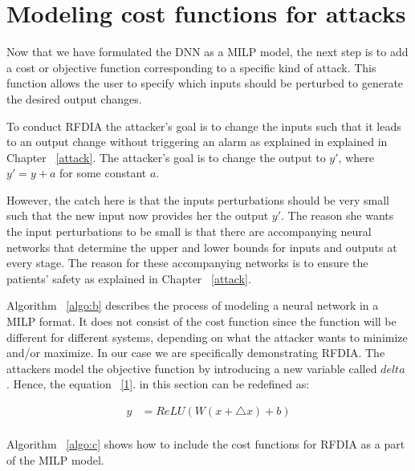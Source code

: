 \section{Modeling cost functions for attacks}
\label{section:costfunction}
Now that we have formulated the DNN as a MILP model, the next step is to add a cost or objective function corresponding to a specific kind of attack. 
This function allows the user to specify which inputs should be perturbed to generate the desired output changes.

To conduct \ac{RFDIA} the attacker's goal is to change the inputs such that it leads to an output change without triggering an alarm as explained in explained in Chapter ~\ref{attack}. 
The attacker's goal is to change the output to $y'$, where $y' = y + a$ for some constant $a$. 

 



However, the catch here is that the inputs perturbations should be very small such that the new input now provides her the output $y'$.  
The reason she wants the input perturbations to be small is that there are accompanying neural networks that determine the upper and lower bounds for inputs and outputs at every stage. 
The reason for these accompanying networks is to ensure the patients' safety as explained in Chapter ~\ref{attack}.

Algorithm ~\ref{algo:b} describes the process of modeling a neural network in a MILP format.
It does not consist of the cost function since the function will be different for different systems, depending on what the attacker wants to minimize and/or maximize.
In our case we are specifically demonstrating \ac{RFDIA}. 
The attackers model the objective function by introducing a new variable called $delta$ . Hence, the equation ~\ref{1}.
in this section can be redefined as:

\begin{align}
\label{11}
y &=  ReLU(W(x + \bigtriangleup  x ) + b)\\
\end{align}

Algorithm ~\ref{algo:c} shows how to include the cost functions for \ac{RFDIA} as a part of the MILP model. 
 
